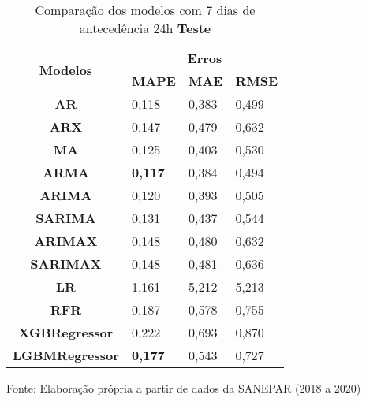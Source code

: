 \begin{table}[H]
	\centering
	\caption{Comparação dos modelos com 7 dias de antecedência 24h \textbf{Teste} }\label{tb:10-24tst}
	\begin{tabular}{@{}clll@{}}
		\toprule
		\multirow{2}{*}{\textbf{Modelos}} & \multicolumn{3}{c}{\textbf{Erros}}                                                                       \\ \cmidrule(l){2-4} 
		& \multicolumn{1}{c}{\textbf{MAPE}} & \multicolumn{1}{c}{\textbf{MAE}} & \multicolumn{1}{c}{\textbf{RMSE}} \\ \hline
\textbf{AR}                       & 0,118                             & 0,383                            & 0,499                             \\
\textbf{ARX}                      & 0,147                             & 0,479                            & 0,632                             \\
\textbf{MA}                       & 0,125                             & 0,403                            & 0,530                             \\
\textbf{ARMA}                     & \textbf{0,117}                             & 0,384                            & 0,494                             \\
\textbf{ARIMA}                    & 0,120                             & 0,393                            & 0,505                             \\
\textbf{SARIMA}                   & 0,131                             & 0,437                            & 0,544                             \\
\textbf{ARIMAX}                   & 0,148                             & 0,480                            & 0,632                             \\
\textbf{SARIMAX}                  & 0,148                             & 0,481                            & 0,636                             \\
\textbf{LR}                       & 1,161                             & 5,212                            & 5,213                             \\
\textbf{RFR}                      & 0,187                             & 0,578                            & 0,755                             \\
\textbf{XGBRegressor}             & 0,222                             & 0,693                            & 0,870                             \\
\textbf{LGBMRegressor}            & \textbf{0,177 }                            & 0,543                            & 0,727                             \\ \bottomrule
	\end{tabular}

Fonte: Elaboração própria a partir de dados da SANEPAR (2018 a 2020)
\end{table}

